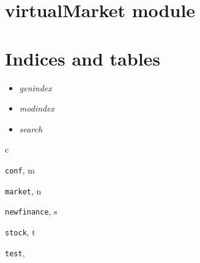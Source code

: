\documentclass[letterpaper,10pt,english]{sphinxmanual}
\begin{document}
\chapter{virtualMarket module}
\label{virtualMarket:virtualmarket-module}\label{virtualMarket::doc}

\chapter{Indices and tables}
\label{index:indices-and-tables}\begin{itemize}
\item {} 
\emph{genindex}

\item {} 
\emph{modindex}

\item {} 
\emph{search}

\end{itemize}


\renewcommand{\indexname}{Python Module Index}
\begin{theindex}
\def\bigletter#1{{\Large\sffamily#1}\nopagebreak\vspace{1mm}}
\bigletter{c}
\item {\texttt{conf}}, \pageref{conf:module-conf}
\indexspace
\bigletter{m}
\item {\texttt{market}}, \pageref{market:module-market}
\indexspace
\bigletter{n}
\item {\texttt{newfinance}}, \pageref{newfinance:module-newfinance}
\indexspace
\bigletter{s}
\item {\texttt{stock}}, \pageref{stock:module-stock}
\indexspace
\bigletter{t}
\item {\texttt{test}}, \pageref{test:module-test}
\end{theindex}

\renewcommand{\indexname}{Index}
\printindex
\end{document}
